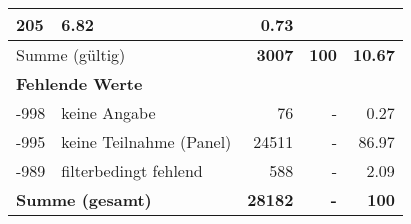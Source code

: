 \begin{longtable}{lXrrr}
       \num{205} &
       \num[round-mode=places,round-precision=2]{6.82} &
         \num[round-mode=places,round-precision=2]{0.73} \\
     \midrule
     \multicolumn{2}{l}{Summe (gültig)} &
       \textbf{\num{3007}} &
     \textbf{\num{100}} &
       \textbf{\num[round-mode=places,round-precision=2]{10.67}} \\
     \multicolumn{5}{l}{\textbf{Fehlende Werte}}\\
       -998 &
       keine Angabe &
         \num{76} &
        - &
         \num[round-mode=places,round-precision=2]{0.27} \\
       -995 &
       keine Teilnahme (Panel) &
         \num{24511} &
        - &
         \num[round-mode=places,round-precision=2]{86.97} \\
       -989 &
       filterbedingt fehlend &
         \num{588} &
        - &
         \num[round-mode=places,round-precision=2]{2.09} \\
     \midrule
     \multicolumn{2}{l}{\textbf{Summe (gesamt)}} &
          \textbf{\num{28182}} &
        \textbf{-} &
        \textbf{\num{100}} \\
     \bottomrule
     \end{longtable}
     
